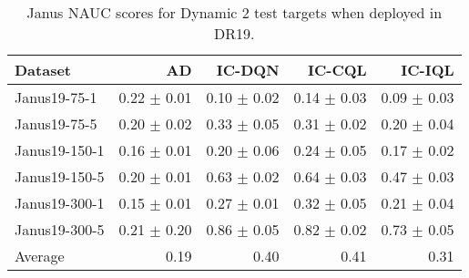 \begin{table}[ht]
    \label{tab:}
    \begin{center}
    \caption{Janus NAUC scores for Dynamic 2 test targets when deployed in DR19.}
    
    \begin{small}
    \begin{adjustbox}{max width=\columnwidth}
		\begin{tabular}{l|rrrr}
		\toprule
	\textbf{Dataset} & \textbf{AD} & \textbf{IC-DQN} & \textbf{IC-CQL} & \textbf{IC-IQL}\\
\midrule
Janus19-75-1 & 0.22 $\pm$ 0.01 & 0.10 $\pm$ 0.02 & 0.14 $\pm$ 0.03 & 0.09 $\pm$ 0.03\\
Janus19-75-5 & 0.20 $\pm$ 0.02 & 0.33 $\pm$ 0.05 & 0.31 $\pm$ 0.02 & 0.20 $\pm$ 0.04\\
Janus19-150-1 & 0.16 $\pm$ 0.01 & 0.20 $\pm$ 0.06 & 0.24 $\pm$ 0.05 & 0.17 $\pm$ 0.02\\
Janus19-150-5 & 0.20 $\pm$ 0.01 & 0.63 $\pm$ 0.02 & 0.64 $\pm$ 0.03 & 0.47 $\pm$ 0.03\\
Janus19-300-1 & 0.15 $\pm$ 0.01 & 0.27 $\pm$ 0.01 & 0.32 $\pm$ 0.05 & 0.21 $\pm$ 0.04\\
Janus19-300-5 & 0.21 $\pm$ 0.20 & 0.86 $\pm$ 0.05 & 0.82 $\pm$ 0.02 & 0.73 $\pm$ 0.05\\
\midrule
Average & 0.19 & 0.40 & 0.41 & 0.31\\
\end{tabular}
        \end{adjustbox}
    \end{small}
    \end{center}
    \vskip -0.1in
\end{table}
    